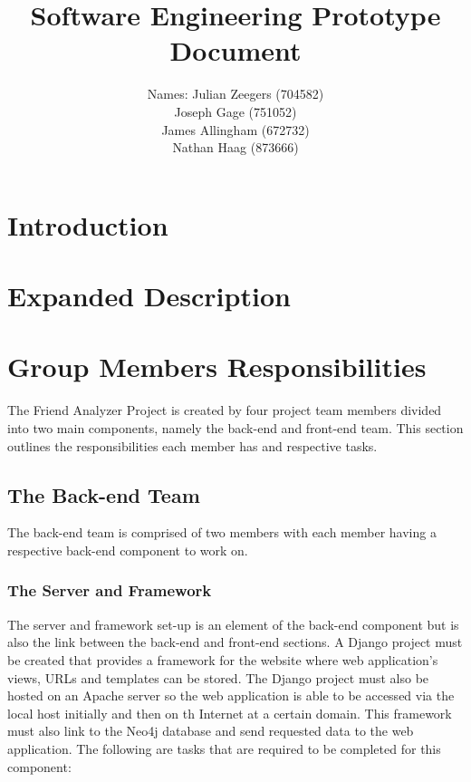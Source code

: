\documentclass[10pt,onecolumn]{article}
\title{\vspace{-4.2cm}Software Engineering Prototype Document }
\author{ Names: Julian Zeegers (704582) \\  Joseph Gage (751052)\\James Allingham (672732) \\ Nathan Haag (873666) }
\begin{document}
\maketitle
\pagestyle{plain}
\setcounter{page}{1}


\section{Introduction}

\section{Expanded Description}

\section{Group Members Responsibilities}
The Friend Analyzer Project is created by four project team members divided into two main components, namely the back-end and front-end team. This section outlines the responsibilities each member has and respective tasks. 


\subsection{The Back-end Team}
The back-end team is comprised of two members with each member having a respective back-end component to work on.

\subsubsection{The Server and Framework}
The server and framework set-up is an element of the back-end component but is also the link between the back-end and front-end sections. A Django project must be created that provides a framework for the website where web application's views, URLs and templates can be stored. The Django project must also be hosted on an Apache server so the web application is able to be accessed via the local host initially and then on th Internet at a certain domain. This framework must also link to the Neo4j database and send requested data to the web application. The following are tasks that are required to be completed for this component:
\end{document}
